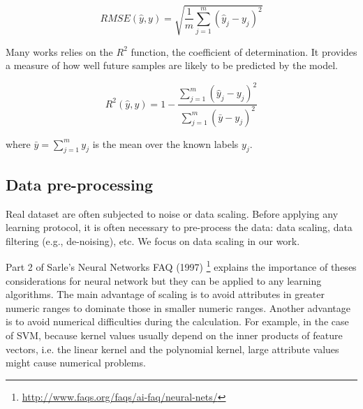 \begin{equation}
RMSE(\hat{y},y) = \sqrt{\frac{1}{m} \sum_{j=1}^m(\hat{y}_j-y_j)^2}
\end{equation}

Many works relies on the $R^2$ function, the coefficient of determination. It provides a measure of how well future samples are likely to be predicted by the model.

\begin{equation}
R^2(\hat{y},y) = 1- \frac{\sum_{j=1}^m (\hat{y}_j-y_j)^2}{\sum_{j=1}^m (\bar{y}-y_j)^2}
\end{equation}

\noindent where $\bar{y} = \sum_{j=1}^m y_j$ is the mean over the known labels $y_j$.


\subsection{Data pre-processing}
Real dataset are often subjected to noise or data scaling. Before applying any learning protocol, it is often necessary to pre-process the data: data scaling, data filtering (e.g., de-noising), etc. We focus on data scaling in our work.

Part 2 of Sarle's Neural Networks FAQ (1997) \footnote{\url{http://www.faqs.org/faqs/ai-faq/neural-nets/}} explains the importance of theses considerations for neural network but they can be applied to any learning algorithms. The main advantage of scaling is to avoid attributes in greater numeric ranges to dominate those in smaller numeric ranges. Another advantage is to avoid numerical difficulties during the calculation. For example, in the case of SVM, because kernel values usually depend on the inner products of feature vectors, i.e. the linear kernel and the polynomial kernel, large attribute values might cause numerical problems. 

